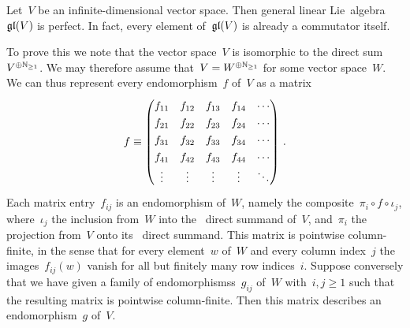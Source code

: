\begin{example}
	Let~$V$ be an infinite-dimensional vector space.
	Then general linear Lie~algebra~$\mathfrak{gl}(V)$ is perfect.
	In fact, every element of~$\mathfrak{gl}(V)$ is already a commutator itself.

	To prove this we note that the vector space~$V$ is isomorphic to the direct sum~$V^{\oplus \mathbb{N}_{\geq 1}}$.
	We may therefore assume that~$V = W^{\oplus \mathbb{N}_{\geq 1}}$ for some vector space~$W$.
	We can thus represent every endomorphism~$f$ of~$V$ as a matrix
	\[
		f
		\equiv
		\begingroup
		\renewcommand{\arraystretch}{1.3}
		\begin{pmatrix}
			f_{11}  & f_{12}  & f_{13}  & f_{14}  & \cdots  \\
			f_{21}  & f_{22}  & f_{23}  & f_{24}  & \cdots  \\
			f_{31}  & f_{32}  & f_{33}  & f_{34}  & \cdots  \\
			f_{41}  & f_{42}  & f_{43}  & f_{44}  & \cdots  \\
			\vdots  & \vdots  & \vdots  & \vdots  & \ddots
		\end{pmatrix} \,.
		\endgroup
	\]
	Each matrix entry~$f_{ij}$ is an endomorphism of~$W$, namely the composite~$\pi_i \circ f \circ \iota_j$, where~$\iota_j$ the inclusion from~$W$ into the~ direct summand of~$V$, and~$\pi_i$ the projection from~$V$ onto its~ direct summand.
	This matrix is pointwise column-finite, in the sense that for every element~$w$ of~$W$ and every column index~$j$ the images~$f_{ij}(w)$ vanish for all but finitely many row indices~$i$.
	Suppose conversely that we have given a family of endomorphismss~$g_{ij}$ of~$W$ with~$i, j \geq 1$ such that the resulting matrix is pointwise column-finite.
	Then this matrix describes an endomorphism~$g$ of~$V$.


\end{example}
